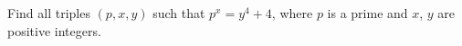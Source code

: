 Find all triples $(p,x,y)$ such that $p^x=y^4+4$, where $p$ is a prime and $x$, $y$ are positive integers.
